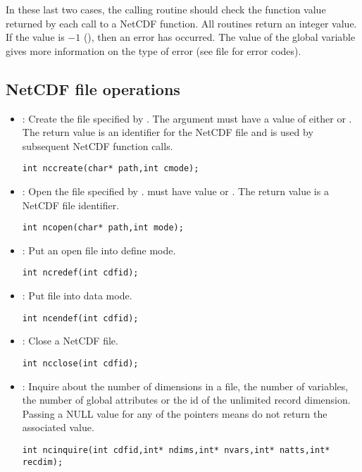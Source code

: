 \documentclass{article}
\begin{document}
In these last two cases, the calling routine should check the function
value returned by each call to a NetCDF function. All routines return
an integer value. If the value is $-1$ (), then an
error has occurred. The value of the global variable 
gives more information on the type of error (see file 
for error codes).

\subsection{NetCDF file operations}

\begin{itemize}

\item {} : Create the file specified by .
The argument  must have a 
value of either  or . The return
value is an identifier for the NetCDF file and is used by subsequent
NetCDF function calls.
\begin{verbatim}
int nccreate(char* path,int cmode);
\end{verbatim}

\item {} : Open the file specified by . 
must have value 
 or . The return value is a NetCDF
file identifier.
\begin{verbatim}
int ncopen(char* path,int mode);
\end{verbatim}

\item {} : Put an open file into define mode. 
\begin{verbatim}
int ncredef(int cdfid);
\end{verbatim}

\item {} : Put file into data mode. 
\begin{verbatim}
int ncendef(int cdfid);
\end{verbatim}

\item {} : Close a NetCDF file. 
\begin{verbatim}
int ncclose(int cdfid);
\end{verbatim}

\item {} : Inquire about the number of dimensions in a file, the
number of 
variables, the number of global attributes or the id of the unlimited
record dimension. Passing a NULL value for any of the pointers means
do not return the associated value.
\begin{verbatim}
int ncinquire(int cdfid,int* ndims,int* nvars,int* natts,int* recdim);
\end{verbatim}


\end{itemize}
\end{document}
